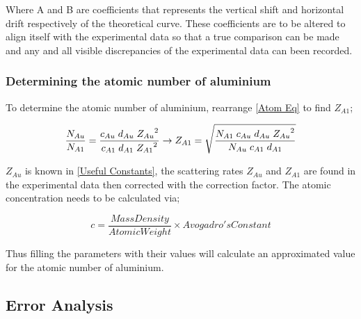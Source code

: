 \documentclass[12pt]{article}
\begin{document}
Where A and B are coefficients that represents the vertical shift and horizontal drift respectively of the theoretical curve. These coefficients are to be altered to align itself with the experimental data so that a true comparison can be made and any and all visible discrepancies of the experimental data can been recorded. \\

\subsubsection{Determining the atomic number of aluminium}
\label{3.3 Determining the atomic number of aluminium Subsubsection}

To determine the atomic number of aluminium, rearrange \cref{Atom Eq} to find $Z_{A1}$;

\begin{equation}
\dfrac{N_{Au}}{N_{A1}} = \dfrac{c_{Au} \hspace{0.1cm} d_{Au} \hspace{0.1cm} {Z_{Au}}^2}{c_{A1} \hspace{0.1cm} d_{A1} \hspace{0.1cm} {Z_{A1}}^2} \rightarrow
{Z_{A1}} = \sqrt{\dfrac{N_{A1} \hspace{0.1cm} c_{Au} \hspace{0.1cm} d_{Au} \hspace{0.1cm} {Z_{Au}}^2}{N_{Au} \hspace{0.1cm} c_{A1} \hspace{0.1cm} d_{A1}}}
\end{equation} 
\vspace{0.2cm}

$Z_{Au}$ is known in \cref{Useful Constants}, the scattering rates $Z_{Au}$ and $Z_{A1}$ are found in the experimental data then corrected with the correction factor. The atomic concentration needs to be calculated via;

\begin{equation}
c = \dfrac{Mass Density}{Atomic Weight} \times Avogadro's Constant
\end{equation}

Thus filling the parameters with their values will calculate an approximated value for the atomic number of aluminium.

\subsection{Error Analysis}
\label{Error Analysis Subsection}
\end{document}
